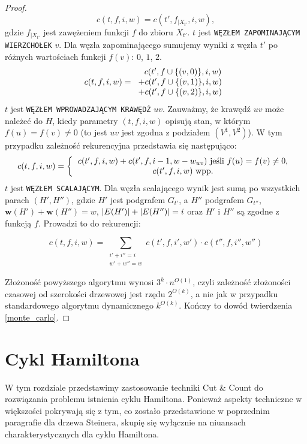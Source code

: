 \documentclass[12pt, oneside]{report}
\newcommand\Omicron{O}
\begin{document}
\begin{proof}
$$c(t,f,i,w) = c(t',f_{\big|X_{t'}},i,w),$$ gdzie $f_{\big|X_{t'}}$ jest zawężeniem funkcji $f$ do zbioru $X_{t'}$.
\newline\newline
$t$ jest \texttt{WĘZŁEM ZAPOMINAJĄCYM WIERZCHOŁEK} $v$. Dla węzła zapominającego sumujemy wyniki z węzła $t'$ po różnych wartościach funkcji $f(v)$: $0$, $1$, $2$.
\[
c(t,f,i,w) =  
  \begin{tabular}{ccc}
  $\ \ c(t',f \cup \{(v, 0)\},i,w)$\\
  $+ c(t',f \cup \{(v, 1)\},i,w)$\\
  $+ c(t',f \cup \{(v, 2)\},i,w)$
  \end{tabular}
\]
\newline
$t$ jest \texttt{WĘZŁEM WPROWADZAJĄCYM KRAWĘDŹ} $uv$. Zauważmy, że krawędź $uv$ może należeć do $H$, kiedy parametry $(t,f,i,w)$ opisują stan, w którym $f(u) = f(v) \neq 0$ (to jest $uv$ jest zgodna z podziałem $(V^1, V^2)$). W tym przypadku zależność rekurencyjna przedstawia się następująco:
\[
c(t,f,i,w) =  
\left \{
  \begin{tabular}{ccc}
  $c(t',f,i,w) + c(t',f,i-1,w-w_{uv})$ jeśli $f(u) = f(v) \neq 0$, \\
  $c(t',f,i,w)$ wpp. \\
  \end{tabular}
\right. 
\]
$t$ jest \texttt{WĘZŁEM SCALAJĄCYM}. Dla węzła scalającego wynik jest sumą po wszystkich parach $(H', H'')$, gdzie $H'$ jest podgrafem $G_{t'}$, a $H''$ podgrafem $G_{t''}$, $\mathbf{w}(H') + \mathbf{w}(H'') = w$, $\abs{E(H')} + \abs{E(H'')} = i$ oraz $H'$ i $H''$ są zgodne z funkcją $f$. Prowadzi to do rekurencji:

$$c(t,f,i,w) = \sum_{\substack{
   i' + i'' = i \\
   w' + w'' = w
  }} c(t',f,i',w') \cdot c(t'',f,i'',w'')$$

Złożoność powyższego algorytmu wynosi $3^k \cdot n^{\Omicron(1)}$, czyli zależność złożoności czasowej od szerokości drzewowej jest rzędu $2^{\Omicron(k)}$, a nie jak w przypadku standardowego algorytmu dynamicznego $k^{\Omicron(k)}$. Kończy to dowód twierdzenia \ref{monte_carlo}.
\end{proof}

    	\section{Cykl Hamiltona}

W tym rozdziale przedstawimy zastosowanie techniki Cut \& Count do rozwiązania problemu istnienia cyklu Hamiltona. Ponieważ aspekty techniczne w większości pokrywają się z tym, co zostało przedstawione w poprzednim paragrafie dla drzewa Steinera, skupię się wyłącznie na niuansach charakterystycznych dla cyklu Hamiltona.
\end{document}
